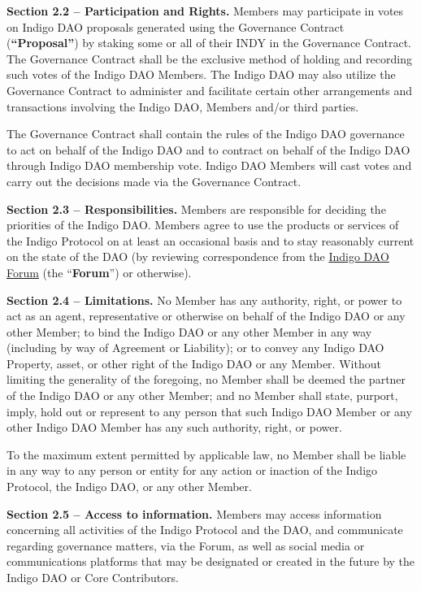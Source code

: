 \textbf{Section 2.2 -- Participation and Rights.} Members may
participate in votes on Indigo DAO proposals generated using the
Governance Contract (\textbf{``Proposal''}) by staking some or all of
their INDY in the Governance Contract. The Governance Contract shall be
the exclusive method of holding and recording such votes of the Indigo
DAO Members. The Indigo DAO may also utilize the Governance Contract to
administer and facilitate certain other arrangements and transactions
involving the Indigo DAO, Members and/or third parties.

The Governance Contract shall contain the rules of the Indigo DAO
governance to act on behalf of the Indigo DAO and to contract on behalf
of the Indigo DAO through Indigo DAO membership vote. Indigo DAO Members
will cast votes and carry out the decisions made via the Governance
Contract.

\textbf{Section 2.3 -- Responsibilities.} Members are responsible for
deciding the priorities of the Indigo DAO. Members agree to use the
products or services of the Indigo Protocol on at least an occasional
basis and to stay reasonably current on the state of the DAO (by
reviewing correspondence from the
\href{https://forum.indigoprotocol.io/}{Indigo DAO Forum} (the
``\textbf{Forum}'') or otherwise).

\textbf{Section 2.4 -- Limitations.} No Member has any authority, right,
or power to act as an agent, representative or otherwise on behalf of
the Indigo DAO or any other Member; to bind the Indigo DAO or any other
Member in any way (including by way of Agreement or Liability); or to
convey any Indigo DAO Property, asset, or other right of the Indigo DAO
or any Member. Without limiting the generality of the foregoing, no
Member shall be deemed the partner of the Indigo DAO or any other
Member; and no Member shall state, purport, imply, hold out or represent
to any person that such Indigo DAO Member or any other Indigo DAO Member
has any such authority, right, or power.

To the maximum extent permitted by applicable law, no Member shall be
liable in any way to any person or entity for any action or inaction of
the Indigo Protocol, the Indigo DAO, or any other Member.

\textbf{Section 2.5 -- Access to information.} Members may access
information concerning all activities of the Indigo Protocol and the
DAO, and communicate regarding governance matters, via the Forum, as
well as social media or communications platforms that may be designated
or created in the future by the Indigo DAO or Core Contributors.

